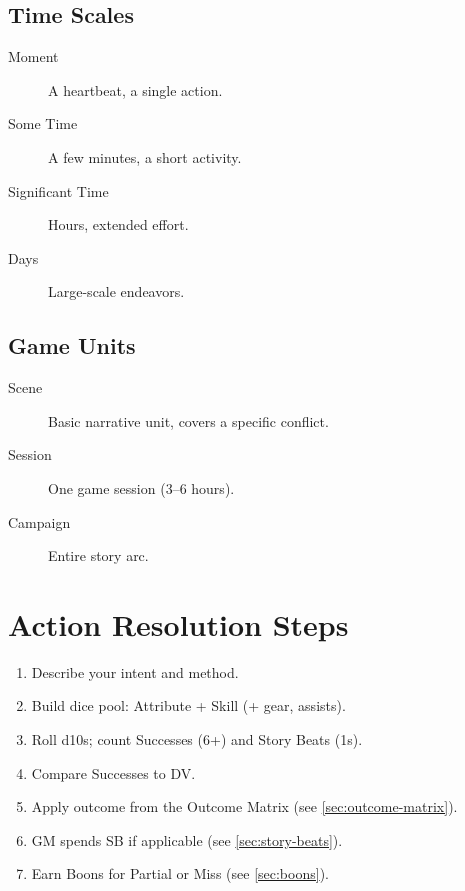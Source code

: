 \subsection{Time Scales}
\begin{description}
  \item[Moment] A heartbeat, a single action.
  \item[Some Time] A few minutes, a short activity.
  \item[Significant Time] Hours, extended effort.
  \item[Days] Large-scale endeavors.
\end{description}

\subsection{Game Units}
\begin{description}
  \item[Scene] Basic narrative unit, covers a specific conflict.
  \item[Session] One game session (3--6 hours).
  \item[Campaign] Entire story arc.
\end{description}

\section{Action Resolution Steps}
\label{sec:action-resolution}

\begin{enumerate}
  \item Describe your intent and method.
  \item Build dice pool: Attribute + Skill (+ gear, assists).
  \item Roll d10s; count Successes (6+) and Story Beats (1s).
  \item Compare Successes to DV.
  \item Apply outcome from the Outcome Matrix (see \ref{sec:outcome-matrix}).
  \item GM spends SB if applicable (see \ref{sec:story-beats}).
  \item Earn Boons for Partial or Miss (see \ref{sec:boons}).
\end{enumerate}

